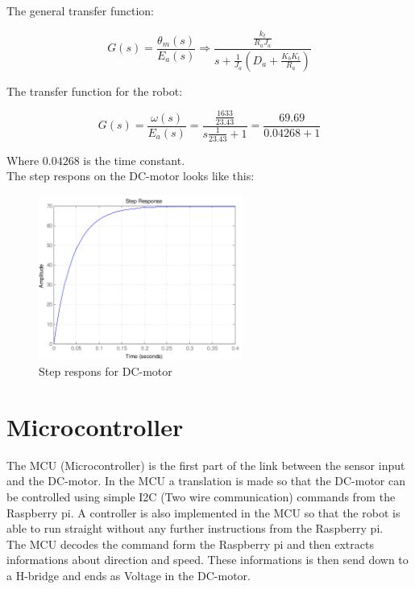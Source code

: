 The general transfer function:

\begin{equation}
G(s)=\frac{\theta_m(s)}{E_a(s)} \Rightarrow \frac{\frac{k_t}{R_a J_a}}{s+\frac{1}{J_a}(D_a + \frac{K_bK_t}{R_a})}
\end{equation}
  
 The transfer function for the robot: 

\begin{equation}
G(s)=\frac{\omega(s)}{E_a(s)}=\frac{\frac{1633}{23.43}}{s\frac{1}{23.43} +1} = \frac{69.69}{0.04268+1}
\end{equation}  

Where $0.04268$ is the time constant. \\
The step respons on the DC-motor looks like this:

\begin{figure}[!h]
	\centering
	\includegraphics[width=0.6\textwidth]{resources/motor_transfer_function.png}
	\caption{Step respons for DC-motor}
	\label{fig:2}
\end{figure}


\section{Microcontroller} 
The MCU (Microcontroller) is the first part of the link between the sensor input and the DC-motor. In the MCU a translation is made so that the DC-motor can be controlled using simple I2C (Two wire communication) commands from the Raspberry pi. A controller is also implemented in the MCU so that the robot is able to run straight without any further instructions from the Raspberry pi.\\

The MCU decodes the command form the Raspberry pi and then extracts informations about direction and speed. These informations is then send down to a H-bridge and ends as Voltage in the DC-motor.

